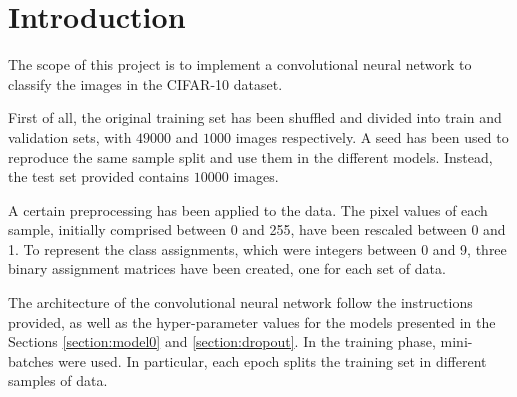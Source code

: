 \documentclass[a4paper,12pt]{article} %
\begin{document}
	

	\thispagestyle{empty}  
	\vspace{0.4cm}

	
	\section{Introduction}
	The scope of this project is to implement a convolutional neural network to 
	classify the images in the CIFAR-10 dataset.
	
	First of all, the original training set has been shuffled and divided into 
	train and validation sets, with $49000$ and $1000$ images respectively. A 
	seed has been used to reproduce the same sample split and use them in the 
	different models. Instead, the test set provided contains $10000$ images.
	
	A certain preprocessing has been applied to the data. The pixel values of 
	each sample, initially comprised between 0 and 255, have been rescaled 
	between 0 and 1. To represent the class assignments, which were integers 
	between 0 and 9, three binary assignment matrices have been created, one 
	for each set of data. 
	
	The architecture of the convolutional neural network follow the 
	instructions provided, as well as the hyper-parameter values for the models 
	presented in the Sections \ref{section:model0} and \ref{section:dropout}.
	In the training phase, mini-batches were used. In particular, each 
	epoch splits the training set in different samples of data.
	
\end{document}
